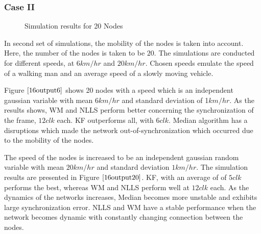 \documentclass[journal]{IEEEtran}
\begin{document}
\subsubsection{\textbf{Case II}}
\begin{figure}
\centerline{
 \hfil {}} \caption{Simulation results for 20 Nodes}
\label{16output}
\end{figure}
In second set of simulations, the mobility of the nodes is taken into account. Here, the number of the nodes is taken to be $20$. The simulations are conducted for different speeds, at $6km/hr$ and $20km/hr$. Chosen speeds emulate the speed of a walking man and an average speed of a slowly moving vehicle.
\par
Figure $\ref{16output6}$ shows 20 nodes with a speed which is an
independent gaussian variable with mean $6km/hr$ and standard
deviation of 1$km/hr$. As the results shows, WM and NLLS perform
better concerning the synchronization of the frame, $12 clk$ each.
KF outperforms all, with $6 clk$. Median algorithm has a disruptions
which made the network out-of-synchronization which occurred due to
the mobility of the nodes.
\par
The speed of the nodes is increased to be an independent gaussian random variable with mean $20km/hr$ and standard deviation $1km/hr$. The simulation results are presented in Figure $\ref{16output20}$. KF, with an average of of $5 clk$ performs the best, whereas WM and NLLS perform well at $12 clk$ each. As the dynamics of the networks increases, Median becomes more unstable and exhibits large synchronization error. NLLS and WM have a stable performance when the network becomes dynamic with constantly changing connection between the nodes.
\end{document}

